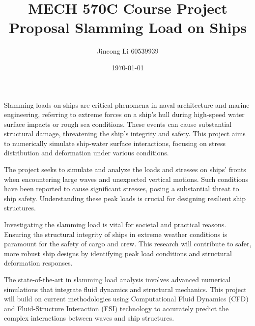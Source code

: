 \documentclass[a4paper,12pt]{article} %
\begin{document}
\setlength{\parskip}{1em} 
\setlength{\parindent}{0pt}
\doublespacing

\title{MECH 570C Course Project Proposal
Slamming Load on Ships}
\author{Jincong Li 60539939}
\date{\today}
\maketitle

Slamming loads on ships are critical phenomena in naval architecture and marine engineering, 
referring to extreme forces on a ship's hull during high-speed water surface impacts or 
rough sea conditions. These events can cause substantial structural damage, threatening 
the ship's integrity and safety. This project aims to numerically simulate ship-water surface
interactions, focusing on stress distribution and deformation under various conditions.

The project seeks to simulate and analyze the loads and stresses on ships' fronts when 
encountering large waves and unexpected vertical motions. Such conditions have been reported 
to cause significant stresses, posing a substantial threat to ship safety. Understanding 
these peak loads is crucial for designing resilient ship structures.

Investigating the slamming load is vital for societal and practical reasons. Ensuring 
the structural integrity of ships in extreme weather conditions is paramount for the 
safety of cargo and crew. This research will contribute to safer, more robust ship designs 
by identifying peak load conditions and structural deformation responses.

The state-of-the-art in slamming load analysis involves advanced numerical simulations 
that integrate fluid dynamics and structural mechanics. This project will build on current 
methodologies using Computational Fluid Dynamics (CFD) and Fluid-Structure Interaction (FSI) 
technology to accurately predict the complex interactions between waves and ship structures.
\end{document}
